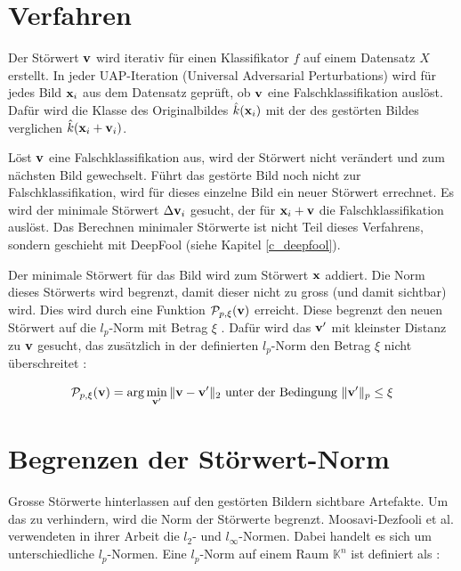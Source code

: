 \documentclass{FFHS_Thesis_Additions/ffhsthesis}
\begin{document}
\section{Verfahren}

Der Störwert $\bold{v}$ wird iterativ für einen Klassifikator $f$ auf einem Datensatz $X$ erstellt. 
In jeder UAP-Iteration (Universal Adversarial Perturbations) wird für jedes Bild $\bold{x}_i$ aus dem Datensatz geprüft, ob $\bold{v}$ eine Falschklassifikation auslöst. 
Dafür wird die Klasse des Originalbildes $\hat k(\bold{x}_i)$ mit der des gestörten Bildes verglichen $\hat k(\bold{x}_i + \bold{v}_i)$.

Löst $\bold{v}$ eine Falschklassifikation aus, wird der Störwert nicht verändert und zum nächsten Bild gewechselt. 
Führt das gestörte Bild noch nicht zur Falschklassifikation, wird für dieses einzelne Bild ein neuer Störwert errechnet. 
Es wird der minimale Störwert $\Delta \bold{v}_i$ gesucht, der für $\bold{x}_i + \bold{v}$ die Falschklassifikation auslöst. 
Das Berechnen minimaler Störwerte ist nicht Teil dieses Verfahrens, sondern geschieht mit DeepFool (siehe Kapitel \ref{c_deepfool}). 

Der minimale Störwert für das Bild wird zum Störwert $\bold{x}$ addiert. 
Die Norm dieses Störwerts wird begrenzt, damit dieser nicht zu gross (und damit sichtbar) wird.
Dies wird durch eine Funktion $\mathcal{P}_{p,\xi}(\bold{v})$ erreicht. Diese begrenzt den neuen Störwert auf die $l_p$-Norm mit Betrag $\xi$ . Dafür wird das $\bold{v'}$ mit kleinster Distanz zu $\bold{v}$ gesucht, das zusätzlich in der definierten $l_p$-Norm den Betrag $\xi$ nicht überschreitet \cite{moosavi-dezfooli_universal_2017-1}:

\[
\mathcal{P}_{p,\xi}(\bold{v}) = \arg \min_{\bold{v'}} \Vert \bold{v} - \bold{v'} \Vert_2
\textnormal{ unter der Bedingung } \Vert \bold{v'} \Vert_p \leq \xi
\]


\section{Begrenzen der Störwert-Norm}
\label{c_begrenzen_stoerwert_norm}

Grosse Störwerte hinterlassen auf den gestörten Bildern sichtbare Artefakte. 
Um das zu verhindern, wird die Norm der Störwerte begrenzt. 
Moosavi-Dezfooli et al. verwendeten in ihrer Arbeit die $l_2$- und $l_\infty$-Normen. 
Dabei handelt es sich um unterschiedliche $l_p$-Normen. Eine $l_p$-Norm auf einem Raum $\mathbb{K}^n$ ist definiert als \cite{kaballo_grundkurs_2018}: 
\end{document}
